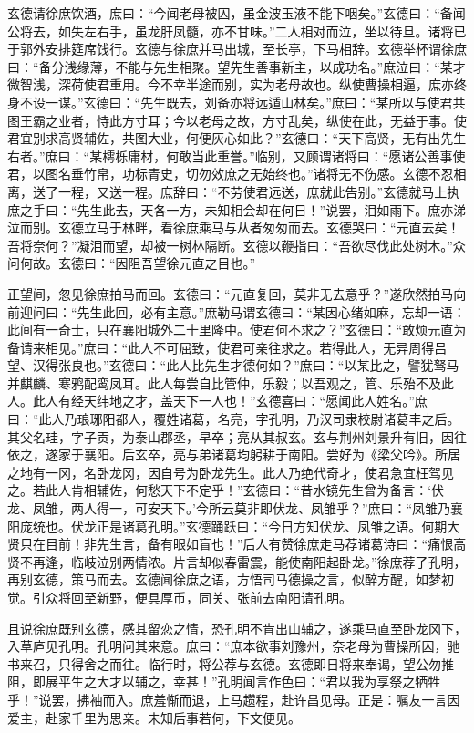 玄德请徐庶饮酒，庶曰：“今闻老母被囚，虽金波玉液不能下咽矣。”玄德曰：“备闻公将去，如失左右手，虽龙肝凤髓，亦不甘味。”二人相对而泣，坐以待旦。诸将已于郭外安排筵席饯行。玄德与徐庶并马出城，至长亭，下马相辞。玄德举杯谓徐庶曰：“备分浅缘薄，不能与先生相聚。望先生善事新主，以成功名。”庶泣曰：“某才微智浅，深荷使君重用。今不幸半途而别，实为老母故也。纵使曹操相逼，庶亦终身不设一谋。”玄德曰：“先生既去，刘备亦将远遁山林矣。”庶曰：“某所以与使君共图王霸之业者，恃此方寸耳；今以老母之故，方寸乱矣，纵使在此，无益于事。使君宜别求高贤辅佐，共图大业，何便灰心如此？”玄德曰：“天下高贤，无有出先生右者。”庶曰：“某樗栎庸材，何敢当此重誉。”临别，又顾谓诸将曰：“愿诸公善事使君，以图名垂竹帛，功标青史，切勿效庶之无始终也。”诸将无不伤感。玄德不忍相离，送了一程，又送一程。庶辞曰：“不劳使君远送，庶就此告别。”玄德就马上执庶之手曰：“先生此去，天各一方，未知相会却在何日！”说罢，泪如雨下。庶亦涕泣而别。玄德立马于林畔，看徐庶乘马与从者匆匆而去。玄德哭曰：“元直去矣！吾将奈何？”凝泪而望，却被一树林隔断。玄德以鞭指曰：“吾欲尽伐此处树木。”众问何故。玄德曰：“因阻吾望徐元直之目也。”

正望间，忽见徐庶拍马而回。玄德曰：“元直复回，莫非无去意乎？”遂欣然拍马向前迎问曰：“先生此回，必有主意。”庶勒马谓玄德曰：“某因心绪如麻，忘却一语：此间有一奇士，只在襄阳城外二十里隆中。使君何不求之？”玄德曰：“敢烦元直为备请来相见。”庶曰：“此人不可屈致，使君可亲往求之。若得此人，无异周得吕望、汉得张良也。”玄德曰：“此人比先生才德何如？”庶曰：“以某比之，譬犹驽马并麒麟、寒鸦配鸾凤耳。此人每尝自比管仲，乐毅；以吾观之，管、乐殆不及此人。此人有经天纬地之才，盖天下一人也！”玄德喜曰：“愿闻此人姓名。”庶曰：“此人乃琅琊阳都人，覆姓诸葛，名亮，字孔明，乃汉司隶校尉诸葛丰之后。其父名珪，字子贡，为泰山郡丞，早卒；亮从其叔玄。玄与荆州刘景升有旧，因往依之，遂家于襄阳。后玄卒，亮与弟诸葛均躬耕于南阳。尝好为《梁父吟》。所居之地有一冈，名卧龙冈，因自号为卧龙先生。此人乃绝代奇才，使君急宜枉驾见之。若此人肯相辅佐，何愁天下不定乎！”玄德曰：“昔水镜先生曾为备言：‘伏龙、凤雏，两人得一，可安天下。’今所云莫非即伏龙、凤雏乎？”庶曰：“凤雏乃襄阳庞统也。伏龙正是诸葛孔明。”玄德踊跃曰：“今日方知伏龙、凤雏之语。何期大贤只在目前！非先生言，备有眼如盲也！”后人有赞徐庶走马荐诸葛诗曰：“痛恨高贤不再逢，临岐泣别两情浓。片言却似春雷震，能使南阳起卧龙。”徐庶荐了孔明，再别玄德，策马而去。玄德闻徐庶之语，方悟司马德操之言，似醉方醒，如梦初觉。引众将回至新野，便具厚币，同关、张前去南阳请孔明。

且说徐庶既别玄德，感其留恋之情，恐孔明不肯出山辅之，遂乘马直至卧龙冈下，入草庐见孔明。孔明问其来意。庶曰：“庶本欲事刘豫州，奈老母为曹操所囚，驰书来召，只得舍之而往。临行时，将公荐与玄德。玄德即日将来奉谒，望公勿推阻，即展平生之大才以辅之，幸甚！”孔明闻言作色曰：“君以我为享祭之牺牲乎！”说罢，拂袖而入。庶羞惭而退，上马趱程，赴许昌见母。正是：嘱友一言因爱主，赴家千里为思亲。未知后事若何，下文便见。